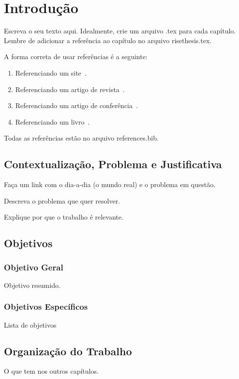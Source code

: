 \chapter{Introdução}
\label{ch:introducao}

Escreva o seu texto aqui. Idealmente, crie um arquivo .tex para cada capítulo. Lembre de adicionar a referência ao capítulo no arquivo risethesis.tex. 


A forma correta de usar referências é a seguinte:

\begin{enumerate}
    \item Referenciando um site~\cite{exemplo-site}.
    \item Referenciando um artigo de revista~\cite{exemplo-revista}.
    \item Referenciando um artigo de conferência~\cite{exemplo-conferencia}.
    \item Referenciando um livro~\cite{exemplo-livro}.
\end{enumerate}

Todas as referências estão no arquivo references.bib.


\section{Contextualização, Problema e Justificativa}
\label{sec:contexto}
Faça um link com o dia-a-dia (o mundo real) e o problema em questão.

Descreva o problema que quer resolver.

Explique por que o trabalho é relevante.

\section{Objetivos}
\label{sec:objetivos}

\subsection{Objetivo Geral}
\label{sec:objetivo-geral}

Objetivo resumido.

\subsection{Objetivos Específicos}
\label{sec:objetivos-especificos}

Lista de objetivos

\section{Organização do Trabalho}
\label{sec:organizacao}

O que tem nos outros capítulos.